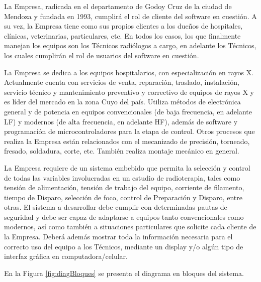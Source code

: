 \documentclass[
11pt, %
]{charter}
\begin{document}
La Empresa, radicada en el departamento de Godoy Cruz de la ciudad de Mendoza y fundada en 1993, cumplirá el rol de cliente del software en cuestión. A su vez, la Empresa tiene como sus propios clientes a los dueños de hospitales, clínicas, veterinarias, particulares, etc. En todos los casos, los que finalmente manejan los equipos son los Técnicos radiólogos a cargo, en adelante los Técnicos, los cuales cumplirán el rol de usuarios del software en cuestión.

La Empresa se dedica a los equipos hospitalarios, con especialización en rayos X. Actualmente cuenta con servicios de venta, reparación, traslado, instalación, servicio técnico y mantenimiento preventivo y correctivo de equipos de rayos X y es líder del mercado en la zona Cuyo del país. Utiliza métodos de electrónica general y de potencia en equipos convencionales (de baja frecuencia, en adelante LF) y modernos (de alta frecuencia, en adelante HF), además de software y programación de microcontroladores para la etapa de control. Otros procesos que realiza la Empresa están relacionados con el mecanizado de precisión, torneado, fresado, soldadura, corte, etc. También realiza montaje mecánico en general.

La Empresa requiere de un sistema embebido que permita la selección y control de todas las variables involucradas en un estudio de radioterapia, tales como tensión de alimentación, tensión de trabajo del equipo, corriente de filamento, tiempo de Disparo, selección de foco, control de Preparación y Disparo, entre otras. El sistema a desarrollar debe cumplir con determinadas pautas de seguridad y debe ser capaz de adaptarse a equipos tanto convencionales como modernos, así como también a situaciones particulares que solicite cada cliente de la Empresa. Deberá además mostrar toda la información necesaria para el correcto uso del equipo a los Técnicos, mediante un display y/o algún tipo de interfaz gráfica en computadora/celular.



En la Figura \ref{fig:diagBloques} se presenta el diagrama en bloques del sistema. 
\end{document}
